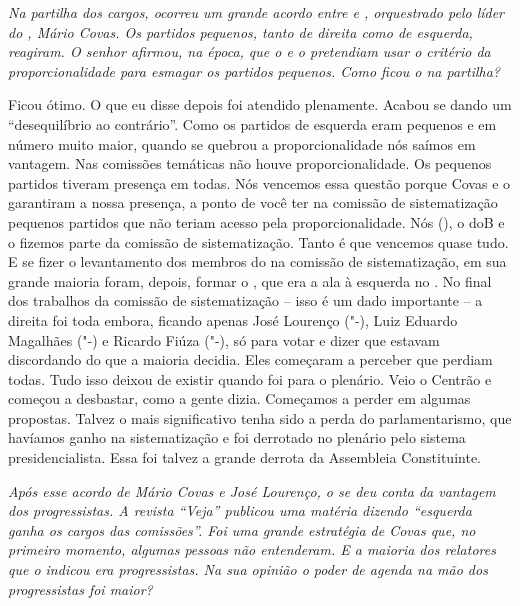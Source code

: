 \medskip

\noindent\emph{Na partilha dos cargos, ocorreu um grande acordo entre  e
, orquestrado pelo líder do , Mário Covas. Os partidos pequenos,
tanto de direita como de esquerda, reagiram. O senhor afirmou, na época,
que o  e o  pretendiam usar o critério da proporcionalidade para
esmagar os partidos pequenos. Como ficou o  na partilha?}

Ficou ótimo. O que eu disse depois foi atendido
plenamente. Acabou se dando um ``desequilíbrio ao contrário''. Como os
partidos de esquerda eram pequenos e em número muito maior, quando se
quebrou a proporcionalidade nós saímos em vantagem. Nas comissões
temáticas não houve proporcionalidade. Os pequenos partidos tiveram
presença em todas. Nós vencemos essa questão porque Covas e o 
garantiram a nossa presença, a ponto de você ter na comissão de
sistematização pequenos partidos que não teriam acesso pela
proporcionalidade. Nós (), o doB e o  fizemos parte da comissão
de sistematização. Tanto é que vencemos quase tudo. E se fizer o
levantamento dos membros do  na comissão de sistematização, em sua
grande maioria foram, depois, formar o , que era a ala à esquerda no
. No final dos trabalhos da comissão de sistematização -- isso é um
dado importante -- a direita foi toda embora, ficando apenas José
Lourenço ("-), Luiz Eduardo Magalhães ("-) e Ricardo Fiúza
("-), só para votar e dizer que estavam discordando do que a maioria
decidia. Eles começaram a perceber que perdiam todas. Tudo isso deixou
de existir quando foi para o plenário. Veio o Centrão e começou a
desbastar, como a gente dizia. Começamos a perder em algumas propostas.
Talvez o mais significativo tenha sido a perda do parlamentarismo, que
havíamos ganho na sistematização e foi derrotado no plenário pelo
sistema presidencialista. Essa foi talvez a grande derrota da Assembleia
Constituinte.

\medskip

\noindent\emph{Após esse acordo de Mário Covas e José Lourenço, o  se deu
conta da vantagem dos progressistas. A revista ``Veja'' publicou uma
matéria dizendo ``esquerda ganha os cargos das comissões''. Foi uma
grande estratégia de Covas que, no primeiro momento, algumas pessoas não
entenderam. E a maioria dos relatores que o  indicou era
progressistas. Na sua opinião o poder de agenda na mão dos progressistas
foi maior?}

